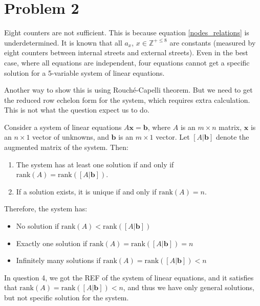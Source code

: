 \documentclass[12pt,a4paper]{article}
\begin{document}
\section*{Problem 2}
\begin{solution}
Eight counters are not sufficient. This is because equation \ref{nodes_relations} is underdetermined. It is known that all $\displaystyle a_{x}$, $\displaystyle x\in \mathbb{Z}^{+\leqslant 8}$ are constants (measured by eight counters between internal streets and external streets). Even in the best case, where all equations are independent, four equations cannot get a specific solution for a 5-variable system of linear equations.

\begin{remark}
Another way to show this is using Rouché-Capelli theorem. But we need to get the reduced row echelon form for the system, which requires extra calculation. This is not what the question expect us to do.
    \begin{theorem}\label{RCTheorem}
    Consider a system of linear equations $A\mathbf{x} = \mathbf{b}$, where $A$ is an $m \times n$ matrix, $\mathbf{x}$ is an $n \times 1$ vector of unknowns, and $\mathbf{b}$ is an $m \times 1$ vector. Let $[A|\mathbf{b}]$ denote the augmented matrix of the system. Then:
    
    \begin{enumerate}
        \item The system has at least one solution if and only if $\text{rank}(A) = \text{rank}([A|\mathbf{b}])$.
        \item If a solution exists, it is unique if and only if $\text{rank}(A) = n$.
    \end{enumerate}
    
    Therefore, the system has:
    \begin{itemize}
        \item No solution if $\text{rank}(A) < \text{rank}([A|\mathbf{b}])$
        \item Exactly one solution if $\text{rank}(A) = \text{rank}([A|\mathbf{b}]) = n$
        \item Infinitely many solutions if $\text{rank}(A) = \text{rank}([A|\mathbf{b}]) < n$
    \end{itemize}
\end{theorem}

In question 4, we got the REF of the system of linear equations, and it satisfies that $\text{rank}(A) = \text{rank}([A|\mathbf{b}]) < n$, and thus we have only general solutions, but not specific solution for the system.
\end{remark}



\end{solution}
\end{document}
